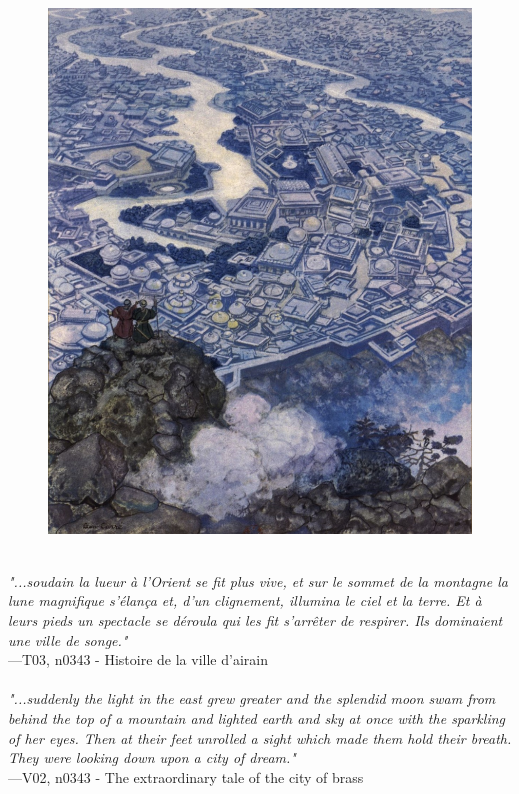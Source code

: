 \documentclass[../Carre_nights.tex]{subfiles}
\begin{document}
\begin{figure}[ht]
\centering
\includegraphics[height=\figsize]{illustrations/volume_3/T03, n0343 - Histoire de la ville d'airain.jpg}
\end{figure}

\textit{\\
"...soudain la lueur à l’Orient se fit plus vive, et sur le sommet de la montagne la lune magnifique s’élança et, d’un clignement, illumina le ciel et la terre. Et à leurs pieds un spectacle se déroula qui les fit s’arrêter de respirer. Ils dominaient une ville de songe."} \\
—T03, n0343 - Histoire de la ville d'airain \\~\\
\textit{"...suddenly the light in the east grew greater and the splendid moon swam from behind the top of a mountain and lighted earth and sky at once with the sparkling of her eyes. Then at their feet unrolled a sight which made them hold their breath. They were looking down upon a city of dream."} \\
—V02, n0343 - The extraordinary tale of the city of brass
\end{document}
